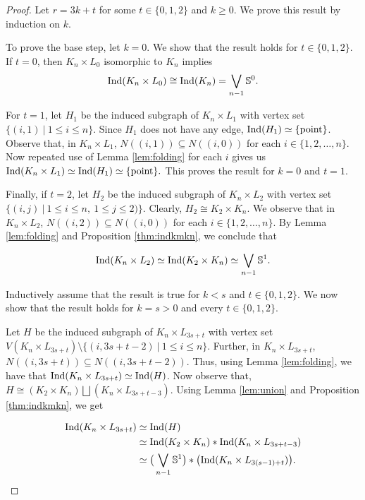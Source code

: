 \documentclass[12pt]{article}
\numberwithin{thm}{section}
\theoremstyle{definition}
\newcommand{\bS}{\mathbb{S}}
\newcommand{\ind}{{\rm{Ind}}}
\begin{document}
\begin{proof}Let $r=3k+t$ for some $t \in \{0,1,2\}$ and $k\geq 0$. We  prove this result by induction on $k$.

To prove the base step, let $k=0$. We show that the result holds for $t \in \{0,1,2\}$. If $t=0$, then  $K_n \times L_0$ isomorphic to $K_n$ implies $$\ind(K_n\times L_0) \cong \ind({K_n}) = \bigvee\limits_{n-1} \bS^0.$$

For $t=1$, let $H_1$ be the induced subgraph of $K_n\times L_1$ with vertex set $\{(i,1)\ | \ 1\leq i \leq n\}$. Since $H_1$ does not have any edge, $\ind(H_1)\simeq \{\text{point}\}$. Observe that, in $K_n\times L_1$, $N((i,1))\subseteq N((i, 0))$ for each $i \in \{1,2, \ldots, n\}$. Now repeated use of Lemma \ref{lem:folding} for each $i$ gives us
$\ind(K_n\times L_1)  \simeq \ind(H_1) \simeq \{\text{point}\}.$
This proves the result for $k=0$ and $t = 1$.

 Finally, if $t=2$, let $H_2$ be the induced subgraph of $K_n \times L_2$ with vertex set $\{(i,j)\ | \ 1\leq i \leq n, \ 1\leq j \leq 2)\}$. Clearly, $H_2 \cong K_2 \times K_n$. We observe that in $K_n \times L_2$, $N((i,2))\subseteq N((i,0))$ for each $i \in \{1,2, \ldots, n\}$. By Lemma \ref{lem:folding} and Proposition \ref{thm:indkmkn}, we conclude that

$$\ind(K_n\times L_2) \simeq \ind(K_2 \times K_n)\simeq \bigvee\limits_{n-1} \bS^1.$$


Inductively assume that the result is true for $k < s$ and $t \in \{0,1,2\}$. We now  show that the result holds for $k=s >0$ and every $t \in \{0,1,2\}$.

Let $H$ be the induced subgraph of $K_n \times L_{3s+t}$ with vertex set $V(K_n \times L_{3s+t}) \setminus \{(i,3s+t-2)\ | \ 1\leq i \leq n\}$. Further, in $K_n\times L_{3s+t}$, $N((i,3s+t))\subseteq N((i,3s+t-2))$. Thus, using Lemma \ref{lem:folding}, we have that $\ind(K_n\times L_{3s+t})\simeq \ind(H)$. Now observe that, $H \cong (K_2\times K_n)\bigsqcup (K_n \times L_{3s+t-3})$. Using Lemma \ref{lem:union} and Proposition \ref{thm:indkmkn}, we get 

\begin{align*}
\ind(K_n\times L_{3s+t}) & \simeq \ind(H)\\
& \simeq \ind(K_2\times K_n) \ast \ind(K_n \times L_{3s+t-3})\\
& \simeq \big{(} \bigvee\limits_{n-1} \bS^1\big{)}\ast \big{(}\ind(K_n \times L_{3(s-1)+t})\big{)}.
\end{align*}


\end{proof}
\end{document}
